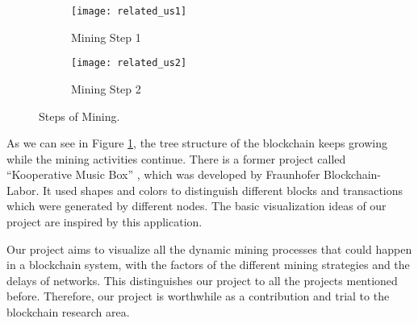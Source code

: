 \begin{figure}[htb]
    \centering
    \begin{subfigure}[b]{1\textwidth}
        \centering
        \texttt{[image: related\_us1]}
        \caption{Mining Step 1}
    \end{subfigure}

    \begin{subfigure}[b]{1\textwidth}
        \centering
        \texttt{[image: related\_us2]}
        \caption{Mining Step 2}
    \end{subfigure}

    \caption{Steps of Mining.}
    \label{fig:steps of mining}
\end{figure}

As we can see in Figure \ref{fig:steps of mining}, the tree structure of the blockchain keeps growing while the mining activities continue. There is a former project called “Kooperative Music Box” \cite{musicbox}, which was developed by Fraunhofer Blockchain-Labor. It used shapes and colors to distinguish different blocks and transactions which were generated by different nodes. The basic visualization ideas of our project are inspired by this application.

Our project aims to visualize all the dynamic mining processes that could happen in a blockchain system, with the factors of the different mining strategies and the delays of networks. This distinguishes our project to all the projects mentioned before. Therefore, our project is worthwhile as a contribution and trial to the blockchain research area.
